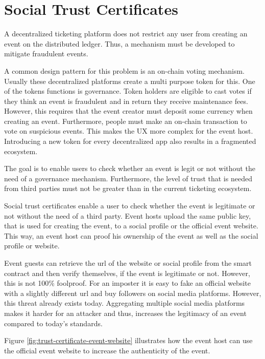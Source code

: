 
\section{Social Trust Certificates}\label{section:social-trust-certificates}

A decentralized ticketing platform does not restrict any user from creating an event on the distributed ledger. Thus, a mechanism must be developed to mitigate fraudulent events.

A common design pattern for this problem is an on-chain voting mechanism. Usually these decentralized platforms create a multi purpose token for this. One of the tokens functions is governance. Token holders are eligible to cast votes if they think an event is fraudulent and in return they receive maintenance fees. However, this requires that the event creator must deposit some currency when creating an event. Furthermore, people must make an on-chain transaction to vote on suspicious events. This makes the UX more complex for the event host. Introducing a new token for every decentralized  app also results in a fragmented ecosystem.

The goal is to enable users to check whether an event is legit or not without the need of a governance mechanism. Furthermore, the level of trust that is needed from third parties must not be greater than in the current ticketing ecosystem. 

Social trust certificates enable a user to check whether the event is legitimate or not without the need of a third party. Event hosts upload the same public key, that is used for creating the event, to a social profile or the official event website. This way, an event host can proof his ownership of the event as well as the social profile or website. 

Event guests can retrieve the url of the website or social profile from the smart contract and then verify themselves, if the event is legitimate or not. However, this is not 100\% foolproof. For an imposter it is easy to fake an official website with a slightly different url and buy followers on social media platforms. However, this threat already exists today. Aggregating multiple social media platforms makes it harder for an attacker and thus, increases the legitimacy of an event compared to today's standards. 

Figure \ref{fig:trust-certificate-event-website} illustrates how the event host can use the official event website to increase the authenticity of the event. 

